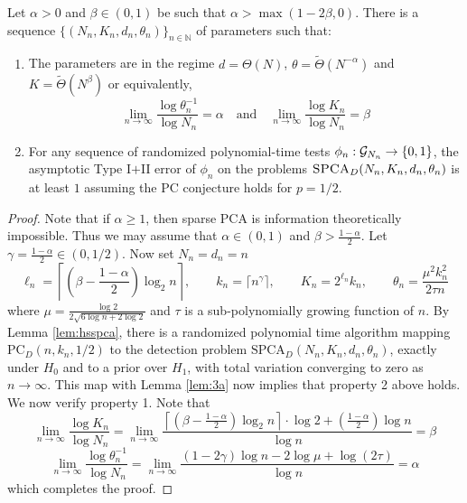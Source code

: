 \begin{theorem} \label{thm:spca}
Let $\alpha > 0$ and $\beta \in (0, 1)$ be such that $\alpha > \max(1 - 2\beta, 0)$. There is a sequence $\{ (N_n, K_n, d_n, \theta_n) \}_{n \in \mathbb{N}}$ of parameters such that:
\begin{enumerate}
\item The parameters are in the regime $d = \Theta(N)$, $\theta = \tilde{\Theta}(N^{-\alpha})$ and $K = \tilde{\Theta}(N^\beta)$ or equivalently,
$$\lim_{n \to \infty} \frac{\log \theta_n^{-1}}{\log N_n} = \alpha \quad \text{and} \quad \lim_{n \to \infty} \frac{\log K_n}{\log N_n} = \beta$$
\item For any sequence of randomized polynomial-time tests $\phi_n : \mathcal{G}_{N_n} \to \{0, 1\}$, the asymptotic Type I$+$II error of $\phi_n$ on the problems $\textsc{SPCA}_D(N_n, K_n, d_n, \theta_n)$ is at least $1$ assuming the PC conjecture holds for $p = 1/2$.
\end{enumerate}
\end{theorem}

\begin{proof}
Note that if $\alpha \ge 1$, then sparse PCA is information theoretically impossible. Thus we may assume that $\alpha \in (0, 1)$ and $\beta > \frac{1 - \alpha}{2}$. Let $\gamma = \frac{1 - \alpha}{2} \in (0, 1/2)$. Now set $N_n = d_n = n$
$$\ell_n = \left\lceil \left( \beta - \frac{1 - \alpha}{2} \right) \log_2 n \right\rceil, \quad \quad k_n = \lceil n^{\gamma} \rceil, \quad \quad K_n = 2^{\ell_n} k_n, \quad \quad \theta_n = \frac{\mu^2 k_n^2}{2 \tau n}$$
where $\mu =  \frac{\log 2}{2 \sqrt{6 \log n + 2\log 2}}$ and $\tau$ is a sub-polynomially growing function of $n$. 
By Lemma \ref{lem:hsspca}, there is a randomized polynomial time algorithm mapping $\text{PC}_D(n, k_n, 1/2)$ to the detection problem $\text{SPCA}_D(N_n, K_n, d_n, \theta_n)$, exactly under $H_0$ and to a prior over $H_1$, with total variation converging to zero as $n \to \infty$. This map with Lemma \ref{lem:3a} now implies that property 2 above holds. We now verify property 1. Note that
$$\lim_{n \to \infty} \frac{\log K_n}{\log N_n} = \lim_{n \to \infty} \frac{\left\lceil \left( \beta - \frac{1 - \alpha}{2} \right) \log_2 n \right\rceil \cdot \log 2 + \left( \frac{1 - \alpha}{2} \right) \log n}{\log n} = \beta$$
$$\lim_{n \to \infty} \frac{\log \theta_n^{-1}}{\log N_n} = \lim_{n \to \infty} \frac{(1 - 2\gamma) \log n - 2 \log \mu + \log(2\tau)}{\log n} = \alpha$$
which completes the proof.
\end{proof}

